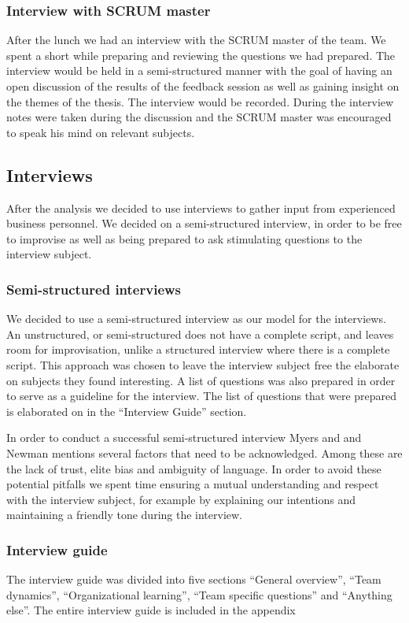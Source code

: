 \subsubsection{Interview with SCRUM master}
After the lunch we had an interview with the SCRUM master of the team. We spent a short while preparing and reviewing the questions we had prepared. The interview would be held in a semi-structured manner with the goal of having an open discussion of the results of the feedback session as well as gaining insight on the themes of the thesis. The interview would be recorded. During the interview notes were taken during the discussion and the SCRUM master was encouraged to speak his mind on relevant subjects. 


\subsection{Interviews}
After the analysis we decided to use interviews to gather input from experienced business personnel. We decided on a semi-structured interview, in order to be free to improvise as well as being prepared to ask stimulating questions to the interview subject.

\subsubsection{Semi-structured interviews}
We decided to use a semi-structured interview as our model for the interviews. An unstructured, or semi-structured does not have a complete script, and leaves room for improvisation, unlike a structured interview where there is a complete script. \cite{Myers2007} This approach was chosen to leave the interview subject free the elaborate on subjects they found interesting. A list of questions was also prepared in order to serve as a guideline for the interview. The list of questions that were prepared is elaborated on in the ``Interview Guide'' section.

In order to conduct a successful semi-structured interview Myers and and Newman mentions several factors that need to be acknowledged. \cite{Myers2007} Among these are the lack of trust, elite bias and ambiguity of language. In order to avoid these potential pitfalls we spent time ensuring a mutual understanding and respect with the interview subject, for example by explaining our intentions and maintaining a friendly tone during the interview. 

\subsubsection{Interview guide}
The interview guide was divided into five sections ``General overview'', ``Team dynamics'', ``Organizational learning'', ``Team specific questions'' and ``Anything else''. The entire interview guide is included in the appendix

